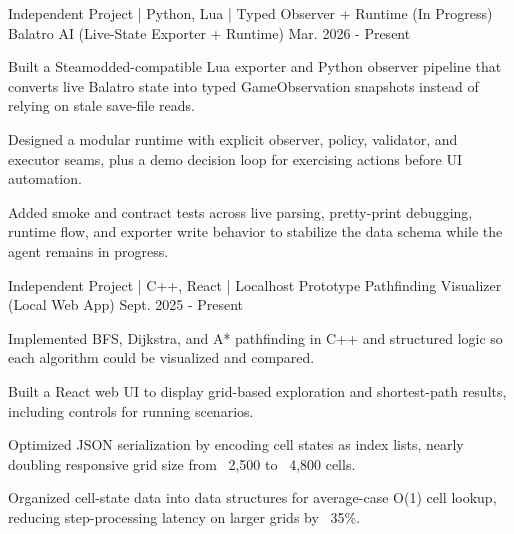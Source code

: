 

\begin{cventries}

  \cventry
    {Independent Project | Python, Lua | Typed Observer + Runtime (In Progress)} %
    {Balatro AI (Live-State Exporter + Runtime)} %
    {} %
    {Mar. 2026 - Present} %
    {
      \begin{cvitems}
        \item {Built a Steamodded-compatible Lua exporter and Python observer pipeline that converts live Balatro state into typed GameObservation snapshots instead of relying on stale save-file reads.}
        \item {Designed a modular runtime with explicit observer, policy, validator, and executor seams, plus a demo decision loop for exercising actions before UI automation.}
        \item {Added smoke and contract tests across live parsing, pretty-print debugging, runtime flow, and exporter write behavior to stabilize the data schema while the agent remains in progress.}
      \end{cvitems}
    }

  \cventry
    {Independent Project | C++, React | Localhost Prototype} %
    {Pathfinding Visualizer (Local Web App)} %
    {} %
    {Sept. 2025 - Present} %
    {
      \begin{cvitems}
        \item {Implemented BFS, Dijkstra, and A* pathfinding in C++ and structured logic so each algorithm could be visualized and compared.}
        \item {Built a React web UI to display grid-based exploration and shortest-path results, including controls for running scenarios.}
        \item {Optimized JSON serialization by encoding cell states as index lists, nearly doubling responsive grid size from ~2,500 to ~4,800 cells.}
        \item {Organized cell-state data into data structures for average-case O(1) cell lookup, reducing step-processing latency on larger grids by ~35\%.}
      \end{cvitems}
    }


\end{cventries}
